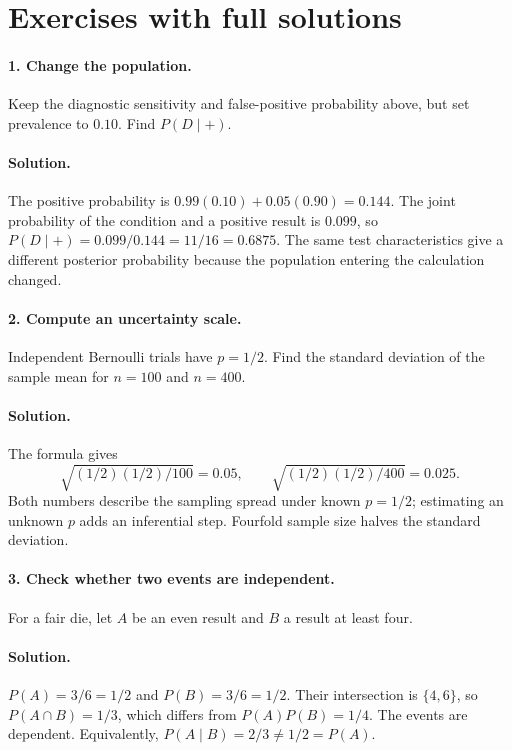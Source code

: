 \section{Exercises with full solutions}
\paragraph{1. Change the population.}
Keep the diagnostic sensitivity and false-positive probability above, but
set prevalence to $0.10$. Find $P(D\mid+)$.

\paragraph{Solution.}
The positive probability is $0.99(0.10)+0.05(0.90)=0.144$.
The joint probability of the condition and a positive result is $0.099$,
so $P(D\mid+)=0.099/0.144=11/16=0.6875$.
The same test characteristics give a different posterior probability because
the population entering the calculation changed.

\paragraph{2. Compute an uncertainty scale.}
Independent Bernoulli trials have $p=1/2$. Find the standard deviation of
the sample mean for $n=100$ and $n=400$.

\paragraph{Solution.}
The formula gives
\[\sqrt{(1/2)(1/2)/100}=0.05,\qquad
\sqrt{(1/2)(1/2)/400}=0.025.\]
Both numbers describe the sampling
spread under known $p=1/2$; estimating an unknown $p$ adds an inferential
step. Fourfold sample size halves the standard deviation.

\paragraph{3. Check whether two events are independent.}
For a fair die, let $A$ be an even result and $B$ a result at least four.

\paragraph{Solution.}
$P(A)=3/6=1/2$ and $P(B)=3/6=1/2$. Their intersection is
$\{4,6\}$, so $P(A\cap B)=1/3$, which differs from $P(A)P(B)=1/4$.
The events are dependent. Equivalently,
$P(A\mid B)=2/3\ne1/2=P(A)$.


